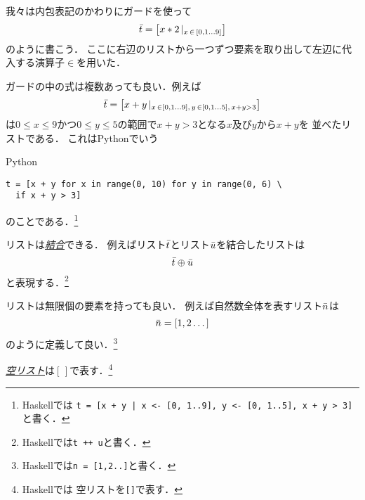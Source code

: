 \documentclass[a5paper,draft]{jsbook}
\newcommand{\programminglanguage}[1]{\textsf{#1}}
\newcommand{\haskell}{\programminglanguage{Haskell}}
\newcommand{\python}{\programminglanguage{Python}}
\newcommand{\keyword}[1]{{\underline{\emph{#1}}}}
\newcommand{\code}[1]{\texttt{#1}}
\newenvironment{pythoncode}{\begin{itembox}[r]{\python}}{\end{itembox}}
\newcommand{\pthnId}[1]{{DO NOT USE}--\textit{#1}}
\newcommand{\pthnKeyword}[1]{{DO NOT USE}--\textbf{#1}}
\newcommand{\pthnOp}[1]{{DO NOT USE}--\texttt{#1}}
\newcommand{\mathListVar}[1]{\Bar{#1}}
\newcommand{\mathGuard}[1]{\mathop{\mid_{#1}}}
\newcommand{\mathEmptyList}{{[\,]}}%
\newcommand{\mathBinaryOperator}[1]{\operatorname{#1}}
\newcommand{\mathAppend}{\oplus}
\newcommand{\mathFrom}{\mathBinaryOperator{\in}}
\begin{document}
我々は内包表記のかわりにガードを使って
\begin{equation}
\mathListVar{t}=\left[x*2\mathGuard{x\mathFrom{[0,1\dots9]}}\right]
\end{equation}
のように書こう．
ここに右辺のリストから一つずつ要素を取り出して左辺に代入する演算子$\mathFrom$を用いた．

ガードの中の式は複数あっても良い．例えば
\begin{equation}
\mathListVar{t}=\left[x+y\mathGuard{x\mathFrom[0,1\dots9],\,y\mathFrom[0,1\dots5],\,x+y>3}\right]
\end{equation}
は$0\le x\le9$かつ$0\le y\le5$の範囲で$x+y>3$となる$x$及び$y$から$x+y$を
並べたリストである．
これは\python でいう
\begin{pythoncode}
\begin{verbatim}
t = [x + y for x in range(0, 10) for y in range(0, 6) \
  if x + y > 3]
\end{verbatim}
\end{pythoncode}
のことである．\footnote{\haskell では
\code{t = [x + y | x <- [0, 1..9], y <- [0, 1..5], x + y > 3]}と書く．}

リストは\keyword{結合}できる．
例えばリスト$\mathListVar{t}$とリスト$\mathListVar{u}$を結合したリストは
\begin{equation}
\mathListVar{t}\mathAppend\mathListVar{u}
\end{equation}
と表現する．\footnote{\haskell では\code{t ++ u}と書く．}

リストは無限個の要素を持っても良い．
例えば自然数全体を表すリスト$\mathListVar{n}$は
\begin{equation}
\mathListVar{n}=[1,2\dots]
\end{equation}
のように定義して良い．\footnote{\haskell では\code{n = [1,2..]}と書く．}

\keyword{空リスト}は$\mathEmptyList$で表す．\footnote{\haskell では
空リストを\code{[]}で表す．}
\end{document}
